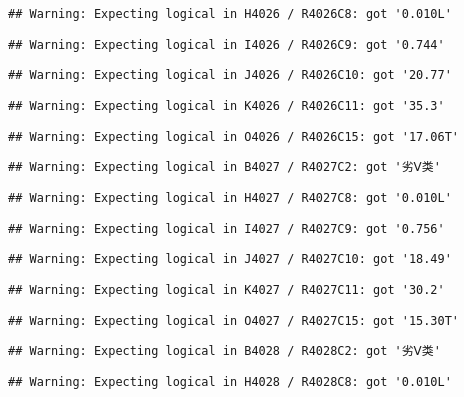 \documentclass[
]{article}
\begin{document}
\begin{verbatim}
## Warning: Expecting logical in H4026 / R4026C8: got '0.010L'
\end{verbatim}

\begin{verbatim}
## Warning: Expecting logical in I4026 / R4026C9: got '0.744'
\end{verbatim}

\begin{verbatim}
## Warning: Expecting logical in J4026 / R4026C10: got '20.77'
\end{verbatim}

\begin{verbatim}
## Warning: Expecting logical in K4026 / R4026C11: got '35.3'
\end{verbatim}

\begin{verbatim}
## Warning: Expecting logical in O4026 / R4026C15: got '17.06T'
\end{verbatim}

\begin{verbatim}
## Warning: Expecting logical in B4027 / R4027C2: got '劣Ⅴ类'
\end{verbatim}

\begin{verbatim}
## Warning: Expecting logical in H4027 / R4027C8: got '0.010L'
\end{verbatim}

\begin{verbatim}
## Warning: Expecting logical in I4027 / R4027C9: got '0.756'
\end{verbatim}

\begin{verbatim}
## Warning: Expecting logical in J4027 / R4027C10: got '18.49'
\end{verbatim}

\begin{verbatim}
## Warning: Expecting logical in K4027 / R4027C11: got '30.2'
\end{verbatim}

\begin{verbatim}
## Warning: Expecting logical in O4027 / R4027C15: got '15.30T'
\end{verbatim}

\begin{verbatim}
## Warning: Expecting logical in B4028 / R4028C2: got '劣Ⅴ类'
\end{verbatim}

\begin{verbatim}
## Warning: Expecting logical in H4028 / R4028C8: got '0.010L'
\end{verbatim}
\end{document}
